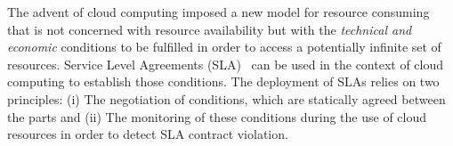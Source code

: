 


The advent of cloud computing imposed a new model for resource consuming that is not concerned
 with resource availability but with the \textit{technical and economic} conditions to be fulfilled in order to access a potentially infinite set of resources. 
Service Level Agreements (SLA)~\cite{SLA} can be used in the context of cloud computing to establish those conditions. The deployment of SLAs relies on two principles: (i) The negotiation of conditions, which are statically agreed between the parts and (ii) The monitoring of these conditions during the use of cloud resources in order to detect SLA contract violation.

